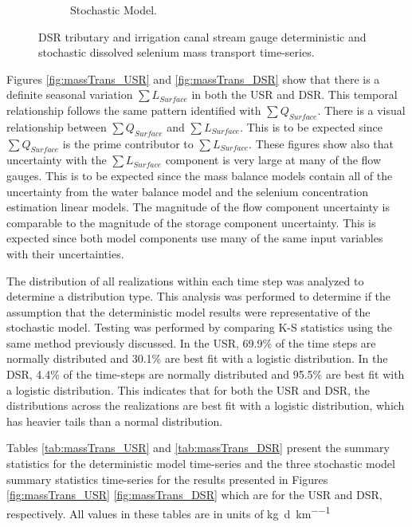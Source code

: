 \begin{landscape}
\begin{figure}
\begin{subfigure}{0.7\textwidth}
			\caption{Stochastic Model.}
		\end{subfigure}
		\caption{DSR tributary and irrigation canal stream gauge deterministic and stochastic dissolved selenium mass transport time-series.}
	\end{figure}
\end{landscape}

Figures \ref{fig:massTrans_USR} and \ref{fig:massTrans_DSR} show that there is a definite seasonal variation $ \sum L_{Surface} $ in both the USR and DSR.  This temporal relationship follows the same pattern identified with $ \sum Q_{Surface} $.  There is a visual relationship between $ \sum Q_{Surface} $ and $ \sum L_{Surface} $.  This is to be expected since $ \sum Q_{Surface} $ is the prime contributor to $ \sum L_{Surface} $.  These figures show also that uncertainty with the $ \sum L_{Surface} $ component is very large at many of the flow gauges.  This is to be expected since the mass balance models contain all of the uncertainty from the water balance model and the selenium concentration estimation linear models.  The magnitude of the flow component uncertainty is comparable to the magnitude of the storage component uncertainty.  This is expected since both model components use many of the same input variables with their uncertainties.

The distribution of all realizations within each time step was analyzed to determine a distribution type.  This analysis was performed to determine if the assumption that the deterministic model results were representative of the stochastic model.  Testing was performed by comparing K-S statistics using the same method previously discussed.  In the USR,  69.9\% of the time steps are normally distributed and 30.1\% are best fit with a logistic distribution.  In the DSR, 4.4\% of the time-steps are normally distributed and 95.5\% are best fit with a logistic distribution.  This indicates that for both the USR and DSR, the distributions across the realizations are best fit with a logistic distribution, which has heavier tails than a normal distribution. 

Tables \ref{tab:massTrans_USR} and \ref{tab:massTrans_DSR} present the summary statistics for the deterministic model time-series and the three stochastic model summary statistics time-series for the results presented in Figures \ref{fig:massTrans_USR} \ref{fig:massTrans_DSR} which are for the USR and DSR, respectively.  All values in these tables are in units of \si{\kilo\gram\per\day\per\kilo\meter}

